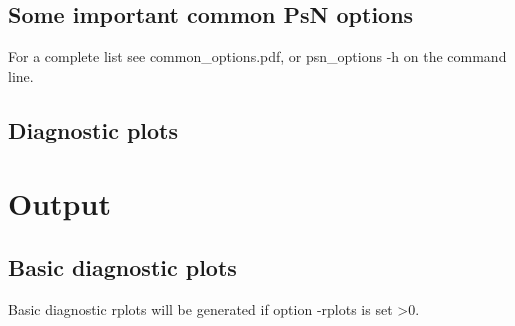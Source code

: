 \subsection{Some important common PsN options}
For a complete list see common\_options.pdf, or psn\_options -h on the command line.


\subsection{Diagnostic plots}
\newcommand{\rplotsconditions}{
See section Output, subsections Basic and Extended diagnostic plots, for descriptions of the default simeval plots. The default simeval template requires that libraries gridExtra, PEIP and PerformanceAnalytics are installed. If the conditions are not fulfilled then no pdf will be generated, see the .Rout file in the main run directory for error messages.}


\section{Output}
\subsection{Basic diagnostic plots}
Basic diagnostic rplots will be generated if option -rplots is set >0.

